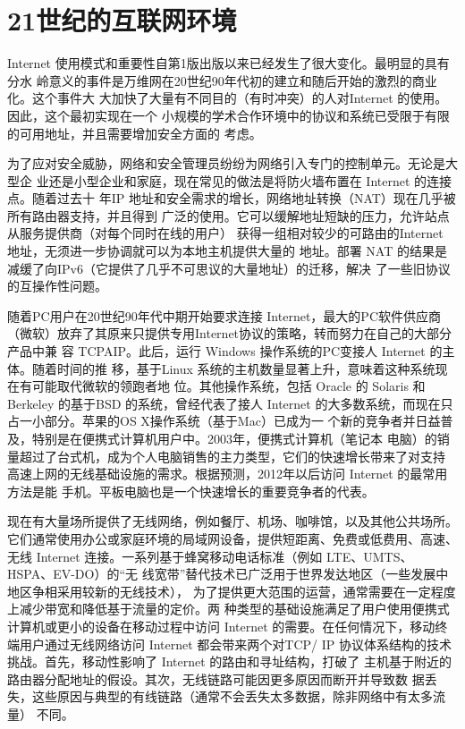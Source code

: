 \section*{21世纪的互联网环境}
Internet 使用模式和重要性自第1版出版以来已经发生了很大变化。最明显的具有分水
岭意义的事件是万维网在20世纪90年代初的建立和随后开始的激烈的商业化。这个事件大
大加快了大量有不同目的（有时冲突）的人对Internet 的使用。因此，这个最初实现在一个
小规模的学术合作环境中的协议和系统已受限于有限的可用地址，并且需要增加安全方面的
考虑。

为了应对安全威胁，网络和安全管理员纷纷为网络引入专门的控制单元。无论是大型企
业还是小型企业和家庭，现在常见的做法是将防火墙布置在 Internet 的连接点。随着过去十
年IP 地址和安全需求的增长，网络地址转换（NAT）现在几乎被所有路由器支持，并且得到
广泛的使用。它可以缓解地址短缺的压力，允许站点从服务提供商（对每个同时在线的用户）
获得一组相对较少的可路由的Internet 地址，无须进一步协调就可以为本地主机提供大量的
地址。部署 NAT 的结果是减缓了向IPv6（它提供了几乎不可思议的大量地址）的迁移，解决
了一些旧协议的互操作性问题。

随着PC用户在20世纪90年代中期开始要求连接 Internet，最大的PC软件供应商
（微软）放弃了其原来只提供专用Internet协议的策略，转而努力在自己的大部分产品中兼
容 TCPAIP。此后，运行 Windows 操作系统的PC变接人 Internet 的主体。随着时间的推
移，基于Linux 系统的主机数量显著上升，意味着这种系统现在有可能取代微软的领跑者地
位。其他操作系统，包括 Oracle 的 Solaris 和 Berkeley 的基于BSD 的系统，曾经代表了接人
Internet 的大多数系统，而现在只占一小部分。苹果的OS X操作系统（基于Mac）已成为一
个新的竞争者并日益普及，特别是在便携式计算机用户中。2003年，便携式计算机（笔记本
电脑）的销量超过了台式机，成为个人电脑销售的主力类型，它们的快速增长带来了对支持
高速上网的无线基础设施的需求。根据预测，2012年以后访问 Internet 的最常用方法是能
手机。平板电脑也是一个快速增长的重要竞争者的代表。

现在有大量场所提供了无线网络，例如餐厅、机场、咖啡馆，以及其他公共场所。
它们通常使用办公或家庭环境的局域网设备，提供短距离、免费或低费用、高速、无线
Internet 连接。一系列基于蜂窝移动电话标准（例如 LTE、UMTS、HSPA、EV-DO）的“无
线宽带”替代技术已广泛用于世界发达地区（一些发展中地区争相采用较新的无线技术），
为了提供更大范围的运营，通常需要在一定程度上减少带宽和降低基于流量的定价。两
种类型的基础设施满足了用户使用便携式计算机或更小的设备在移动过程中访问 Internet
的需要。在任何情况下，移动终端用户通过无线网络访问 Internet 都会带来两个对TCP/
IP 协议体系结构的技术挑战。首先，移动性影响了 Internet 的路由和寻址结构，打破了
主机基于附近的路由器分配地址的假设。其次，无线链路可能因更多原因而断开并导致数
据丢失，这些原因与典型的有线链路（通常不会丢失太多数据，除非网络中有太多流量）
不同。

